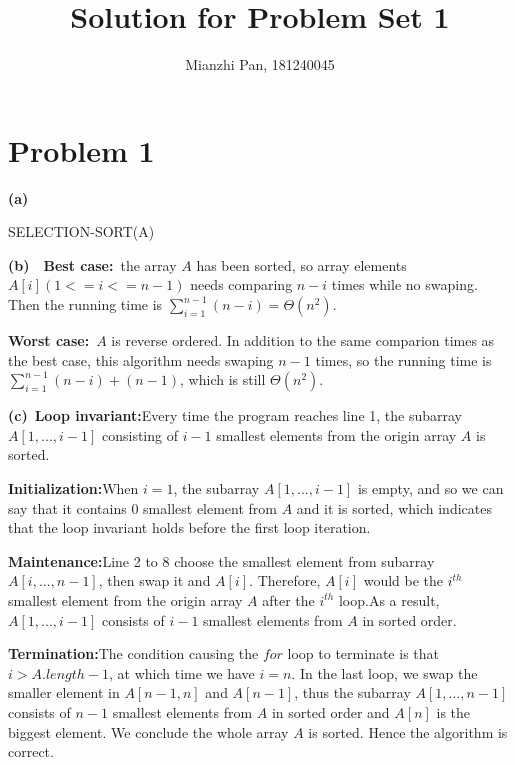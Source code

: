 \documentclass[]{article}
\title{Solution for Problem Set 1}
\author{Mianzhi Pan, 181240045}
\begin{document}
	\maketitle
	\section{Problem 1}
	
	\textbf{(a)}
	\begin{algorithm}[h]
		\caption{SELECTION-SORT(A)} %
		\begin{algorithmic}[1]
			\EndIf
			\EndFor
			\EndFor
		\end{algorithmic}
	\end{algorithm}

	\textbf{(b)}\ \ \textbf{Best case:}\ the array $A$ has been sorted, so array elements $A[i](1<= i <= n-1)$ needs comparing $n-i$ times while no swaping. Then the running time is $\sum_{i=1}^{n-1}(n-i)=\Theta(n^2)$.
	
	\textbf{Worst case:}\ $A$ is reverse ordered. In addition to the same comparion times as the best case, this algorithm needs swaping $n-1$ times, so the running time is $\sum_{i=1}^{n-1}(n-i)+(n-1)$, which is still $\Theta(n^2)$.
	
	\textbf{(c)}\ \textbf{Loop invariant:}Every time the program reaches line 1, the subarray $A[1,...,i - 1]$ consisting of $i - 1$ smallest elements from the origin array $A$ is sorted.
		
	\textbf{Initialization:}When $i=1$, the subarray $A[1,...,i - 1]$ is empty, and so we can say that it contains 0 smallest element from $A$ and it is sorted, which indicates that the loop invariant holds before the first loop iteration.
	
	\textbf{Maintenance:}Line 2 to 8 choose the smallest element from subarray $A[i,...,n - 1]$, then swap it and $A[i]$. Therefore, $A[i]$ would be the $i^{th}$ smallest element from the origin array $A$ after the $i^{th}$ loop.As a result, $A[1,...,i-1]$ consists of $i - 1$ smallest elements from $A$ in sorted order.
	
	\textbf{Termination:}The condition causing the $for$ loop to terminate is that $i>A.length - 1$, at which time we have $i = n$. In the last loop, we swap the smaller element in $A[n-1, n]$ and $A[n-1]$, thus the subarray $A[1,...,n-1]$ consists of $n - 1$ smallest elements from $A$ in sorted order and $A[n]$ is the biggest element. We conclude the whole array $A$ is sorted. Hence the algorithm is correct.
\end{document}
